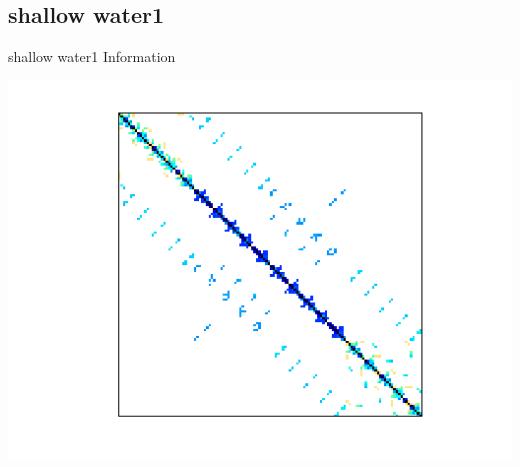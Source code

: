\subsection{shallow water1}
\begin{table}[h!]
	\begin{minipage}{0.5\linewidth}
		\caption{shallow water1 Information}
		\label{table:shallow water1}
		\centering
        
	\end{minipage}\hfill
	\begin{minipage}{0.45\linewidth}
		\centering
		\includegraphics[width=1\textwidth]{figs/shallow_water1.png}
		\label{fig:shallow water1}
	\end{minipage}
\end{table}




